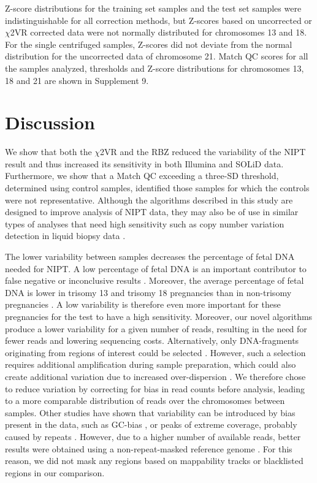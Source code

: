 Z-score distributions for the training set samples and the test set samples were indistinguishable for all correction methods, but Z-scores based on uncorrected or $\chi$2VR corrected data were not normally distributed for chromosomes 13 and 18. 
For the single centrifuged samples, Z-scores did not deviate from the normal distribution for the uncorrected data of chromosome 21. 
Match QC scores for all the samples analyzed, thresholds and Z-score distributions for chromosomes 13, 18 and 21 are shown in Supplement 9.

\section{Discussion}\label{Discussion}
We show that both the $\chi$2VR and the RBZ reduced the variability of the NIPT result and thus increased its sensitivity in both Illumina and SOLiD data. 
Furthermore, we show that a Match QC exceeding a three-SD threshold, determined using control samples, identified those samples for which the controls were not representative. 
Although the algorithms described in this study are designed to improve analysis of NIPT data, they may also be of use in similar types of analyses that need high sensitivity such as copy number variation detection in liquid biopsy data \cite{Chan_2012,Leary_2012}.

The lower variability between samples decreases the percentage of fetal DNA needed for NIPT. 
A low percentage of fetal DNA is an important contributor to false negative or inconclusive results \cite{Mackie_2016}. 
Moreover, the average percentage of fetal DNA is lower in trisomy 13 and trisomy 18 pregnancies than in non-trisomy pregnancies \cite{Wegrzyn_2006}\cite{Ashoor_2012a}. 
A low variability is therefore even more important for these pregnancies for the test to have a high sensitivity. 
Moreover, our novel algorithms produce a lower variability for a given number of reads, resulting in the need for fewer reads and lowering sequencing costs. 
Alternatively, only DNA-fragments originating from regions of interest could be selected \cite{Sparks_2012b,Ashoor_2013,Zimmermann_2012}. 
However, such a selection requires additional amplification during sample preparation, which could also create additional variation due to increased over-dispersion \cite{Mutter_1995,Dohm_2008}. 
We therefore chose to reduce variation by correcting for bias in read counts before analysis, leading to a more comparable distribution of reads over the chromosomes between samples. 
Other studies have shown that variability can be introduced by bias present in the data, such as GC-bias \cite{Fan_2008,Chen_2011,Lau_2012,Palomaki_2012,Liang_2013,Fan_2010}, or peaks of extreme coverage, probably caused by repeats \cite{Fan_2010}. 
However, due to a higher number of available reads, better results were obtained using a non-repeat-masked reference genome \cite{Chen_2011,Palomaki_2012}. 
For this reason, we did not mask any regions based on mappability tracks or blacklisted regions in our comparison.

